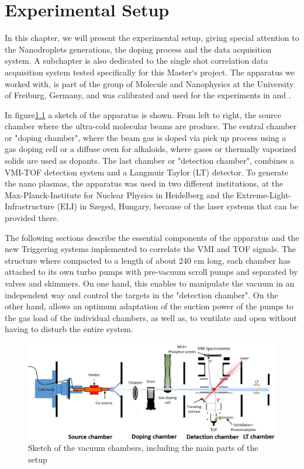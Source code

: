 
\chapter{Experimental Setup}

In this chapter, we will present the experimental setup, giving special attention to the Nanodroplets generations, the doping process and the data acquisition system. A subchapter is also dedicated to the single shot correlation data acquisition system tested specifically for this Master`s project.
The apparatus we worked with, is part of the group of Molecule and Nanophysics at the University of Freiburg, Germany, and was calibrated and used for the experiments in \cite{schomas_compact_2017} and \cite{heidenreich_charging_2016}.

In figure\ref{img:setup} a sketch of the apparatus is shown. From left to right, the source chamber where the ultra-cold molecular beams are produce. The central chamber or "doping chamber", where the beam gas is doped via pick up process using a gas doping cell or a diffuse oven for alkaloids, where gases or thermally vaporized solids are used as dopants. The last chamber or "detection chamber", combines a VMI-TOF detection system and a Langmuir Taylor (LT) detector.
To generate the nano plasmas, the apparatus was used in two different institutions, at the Max-Planck-Institute for Nuclear Physics in Heidelberg and the Extreme-Light-Infrastructure (ELI) in Szeged, Hungary, because of the laser systems that can be provided there.

The following sections describe the essential components of the apparatus and the new Triggering systems implemented to correlate the VMI and TOF signals.  The structure where compacted to a length of about 240 cm long, each chamber has attached to its own turbo pumps with pre-vacuum scroll pumps and separated by valves and skimmers. On one hand, this enables to manipulate the vacuum in an independent way and control the targets in the "detection chamber". On the other hand, allows an optimum adaptation of the suction power of the pumps to the gas load of the individual chambers, as well as, to ventilate and open without having to disturb the entire system.
\begin{figure}[hbtp] \label{img:setup}

\centering
\includegraphics[width=16 cm]{../Images/setup.png}
\caption{Sketch of the vacuum chambers, including the main parts of the setup}
\end{figure}



